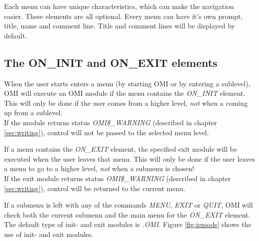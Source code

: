 \documentclass[a4paper]{book}
\newcommand{\vs}{\vspace{3mm}}
\begin{document}
Each menu can have unique characteristics, which can make the navigation 
easier. These elements are all optional. Every menu can have it's own 
prompt, title, name and comment line. Title and comment lines will be 
displayed by default.

\subsection{The ON{\_}INIT and ON{\_}EXIT elements}
\label{subsubsec:mylabel22}

When the user starts enters a menu (by starting OMI or by entering a 
sublevel), OMI will execute an OMI module if the menu contains the 
\textsl{ON{\_}INIT} element. This will only be done 
if the user comes from a higher level, \textit{not} when a coming up from a sublevel. \\
If the module returns status \textsl{OMI{\$}{\_}WARNING} (described in chapter \ref{sec:writing}), 
control will not be passed to the selected menu level.

\vs

If a menu contains the \textsl{ON{\_}EXIT} element, the 
specified exit module will be executed when the user leaves that menu. This 
will only be done if the user leaves a menu to go to a higher level, \textit{not} when a 
submenu is chosen! \\
If the exit module returns status \textsl{OMI{\$}{\_}WARNING} (described in chapter 
\ref{sec:writing}), control will be returned to the current menu.

\vs

If a submenu is left with any of the commands \textsl{MENU}, \textsl{EXIT} or \textsl{QUIT}, OMI will 
check both the current submenu and the main menu for the \textsl{ON{\_}EXIT} element. \\
The default type of init- and exit modules is \textsl{.OMI}. Figure \ref{fig:iemods}
shows the use of init- and exit modules.
\end{document}
